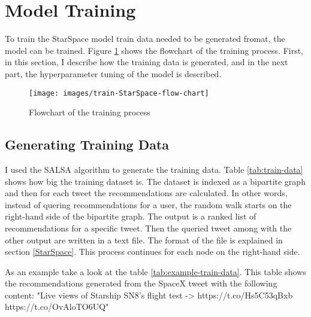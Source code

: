 \section{Model Training}
\label{sec:model-training}
To train the StarSpace model train data needed to be generated fromat, the model can be trained. Figure \ref{fig:star-space-training} shows the flowchart of the training process. First, in this section, I describe how the training data is generated, and in the next part, the hyperparameter tuning of the model is described.

\begin{figure}[!h]
	\centering
	\texttt{[image: images/train-StarSpace-flow-chart]}
	\caption{Flowchart of the training process}
	\label{fig:star-space-training}
\end{figure}

\subsection{Generating Training Data}
\label{subsec:generating-training-data}
I used the SALSA algorithm to generate the training data. Table \ref{tab:train-data} shows how big the training dataset is. The dataset is indexed as a bipartite graph and then for each tweet the recommendations are calculated. In other words, instead of quering recommendations for a user, the random walk starts on the right-hand side of the bipartite graph. The output is a ranked list of recommendations for a specific tweet. Then the queried tweet among with the other output are written in a text file. The format of the file is explained in section \ref{StarSpace}. This process continues for each node on the right-hand side.



As an example take a look at the table \ref{tab:example-train-data}. This table shows the recommendations generated from the SpaceX tweet with the following content: "Live views of Starship SN8’s flight test -> https://t.co/Hs5C53qBxb https://t.co/OvAloTO6UQ"


